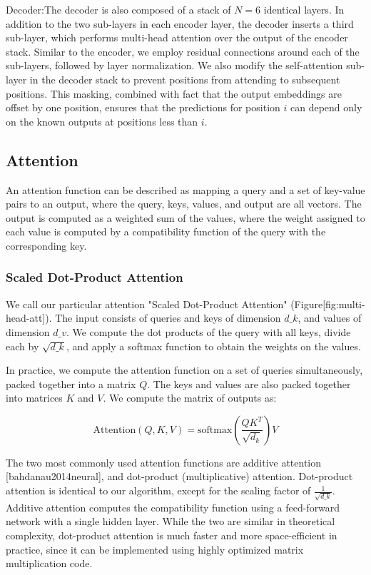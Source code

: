 \documentclass[11pt,a4paper]{article}
\begin{document}
Decoder:The decoder is also composed of a stack of $N=6$ identical layers.  In addition to the two sub-layers in each encoder layer, the decoder inserts a third sub-layer, which performs multi-head attention over the output of the encoder stack.  Similar to the encoder, we employ residual connections around each of the sub-layers, followed by layer normalization.  We also modify the self-attention sub-layer in the decoder stack to prevent positions from attending to subsequent positions.  This masking, combined with fact that the output embeddings are offset by one position, ensures that the predictions for position $i$ can depend only on the known outputs at positions less than $i$.

\subsection{Attention}

An attention function can be described as mapping a query and a set of key-value pairs to an output, where the query, keys, values, and output are all vectors.  The output is computed as a weighted sum of the values, where the weight assigned to each value is computed by a compatibility function of the query with the corresponding key.

\subsubsection{Scaled Dot-Product Attention}

We call our particular attention "Scaled Dot-Product Attention" (Figure[fig:multi-head-att]).   The input consists of queries and keys of dimension $d\_k$, and values of dimension $d\_v$.  We compute the dot products of the query with all keys, divide each by $\sqrt{d\_k}$, and apply a softmax function to obtain the weights on the values.

In practice, we compute the attention function on a set of queries simultaneously, packed together into a matrix $Q$.   The keys and values are also packed together into matrices $K$ and $V$.  We compute the matrix of outputs as:

$$\mathrm{Attention}(Q, K, V) = \mathrm{softmax}(\frac{QK^T}{\sqrt{d_k}})V$$

The two most commonly used attention functions are additive attention [bahdanau2014neural], and dot-product (multiplicative) attention.  Dot-product attention is identical to our algorithm, except for the scaling factor of $\frac{1}{\sqrt{d\_k}}$. Additive attention computes the compatibility function using a feed-forward network with a single hidden layer.  While the two are similar in theoretical complexity, dot-product attention is much faster and more space-efficient in practice, since it can be implemented using highly optimized matrix multiplication code.
\end{document}
